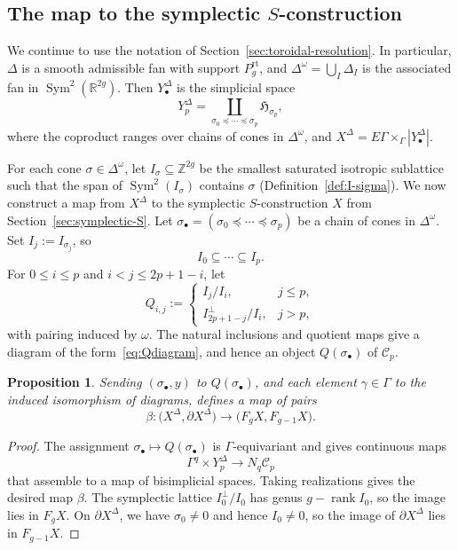 \documentclass[12 pt]{amsart}
\newcommand{\fH}{\mathfrak H}
\newcommand{\RR}{\mathbb{R}}
\newcommand{\ZZ}{\mathbb{Z}}
\newcommand{\cC}{\mathcal{C}}
\newcommand{\rank}{\operatorname{rank}}
\newcommand{\Sym}{\operatorname{Sym}}
\newcommand{\rt}{\mathrm{rt}}
\newcommand{\<}{\langle}
\renewcommand{\>}{\rangle}
\newtheorem{proposition}[theorem]{Proposition}
\theoremstyle{definition}
\begin{document}
\subsection{The map to the symplectic \texorpdfstring{$S$}{S}-construction}\label{sec:flag-map}

We continue to use the notation of Section~\ref{sec:toroidal-resolution}. In particular, $\Delta$ is a smooth admissible fan with support $P_g^\rt$, and $\Delta^\omega = \bigcup_I \Delta_I$ is the associated fan in $\Sym^2(\RR^{2g})$. Then $Y_\bullet^\Delta$ is the simplicial space
\[
Y_p^\Delta = \coprod_{\sigma_0 \preceq \cdots \preceq \sigma_p} \fH_{\sigma_p},
\]
where the coproduct ranges over chains of cones in $\Delta^\omega$, and $X^\Delta = E \Gamma \times_\Gamma |Y_\bullet^\Delta|$.

For each cone $\sigma \in \Delta^\omega$, let $I_\sigma \subseteq \ZZ^{2g}$ be the smallest saturated isotropic sublattice such that the span of $\Sym^2(I_\sigma)$ contains $\sigma$ (Definition~\ref{def:I-sigma}).  We now construct a map from $X^\Delta$ to the symplectic $S$-construction $X$ from Section~\ref{sec:symplectic-S}. Let $\sigma_\bullet = (\sigma_0 \preceq \cdots \preceq \sigma_p)$ be a chain of cones in $\Delta^\omega$. Set $I_j := I_{\sigma_j}$, so
\[
I_0 \subseteq \cdots \subseteq I_p.
\]
For $0 \leq i \leq p$ and $i < j \leq 2p + 1 - i$, let
\[
Q_{i, j} :=
\begin{cases}
I_j/I_i, & j \leq p,\\[2pt]
I_{2p + 1 - j}^\perp/I_i, & j > p,
\end{cases}
\]
with pairing induced by $\omega$. The natural inclusions and quotient maps give a diagram of the form~\eqref{eq:Qdiagram}, and hence an object $Q(\sigma_\bullet)$ of $\cC_p$.

\begin{proposition}\label{prop:flag-map}
Sending $(\sigma_\bullet, y)$ to $Q(\sigma_\bullet)$, and each element $\gamma \in \Gamma$ to the induced isomorphism of diagrams, defines a map of pairs
\[
\beta \colon \bigl(X^\Delta, \partial X^\Delta\bigr) \longrightarrow \bigl(F_g X, F_{g - 1} X\bigr).
\]
\end{proposition}

\begin{proof}
The assignment $\sigma_\bullet \mapsto Q(\sigma_\bullet)$ is $\Gamma$-equivariant and gives continuous maps
\[
\Gamma^q \times Y_p^\Delta \longrightarrow N_q \cC_p
\]
that assemble to a map of bisimplicial spaces. Taking realizations gives the desired map $\beta$. The symplectic lattice $I_0^\perp/I_0$ has genus $g - \rank I_0$, so the image lies in $F_g X$. On $\partial X^\Delta$, we have $\sigma_0 \neq 0$ and hence $I_0 \neq 0$, so the image of $\partial X^\Delta$ lies in $F_{g - 1} X$.
\end{proof}
\end{document}

